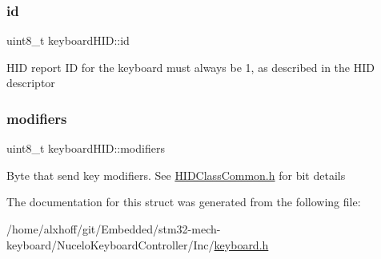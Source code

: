 \subsubsection{\texorpdfstring{id}{id}}
{\footnotesize\ttfamily uint8\+\_\+t keyboard\+H\+I\+D\+::id}

H\+ID report ID for the keyboard must always be 1, as described in the H\+ID descriptor \mbox{\label{structkeyboardHID_af9b16f0982275eddfa430dd71fa64825}} 
\subsubsection{\texorpdfstring{modifiers}{modifiers}}
{\footnotesize\ttfamily uint8\+\_\+t keyboard\+H\+I\+D\+::modifiers}

Byte that send key modifiers. See \hyperlink{HIDClassCommon_8h}{H\+I\+D\+Class\+Common.\+h} for bit details 

The documentation for this struct was generated from the following file\+:\begin{DoxyCompactItemize}
\item 
/home/alxhoff/git/\+Embedded/stm32-\/mech-\/keyboard/\+Nucelo\+Keyboard\+Controller/\+Inc/\hyperlink{keyboard_8h}{keyboard.\+h}\end{DoxyCompactItemize}
